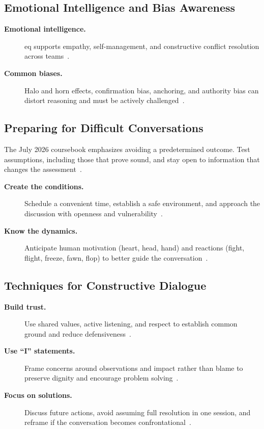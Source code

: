 \documentclass[../main.tex]{subfiles}
\begin{document}
\subsection{Emotional Intelligence and Bias Awareness}
\begin{description}
  \item[\textbf{Emotional intelligence.}] \ac{eq} supports empathy, self-management, and constructive
  conflict resolution across teams~\autocite{edo-5-2-9-critical-conversations-2025}.
  \item[\textbf{Common biases.}] Halo and horn effects, confirmation bias, anchoring, and authority bias can
  distort reasoning and must be actively challenged~\autocite{edo-5-2-9-critical-conversations-2025}.
\end{description}

\subsection{Preparing for Difficult Conversations}
\noindent The July 2026 coursebook emphasizes avoiding a predetermined outcome. Test assumptions, including those that prove sound, and stay open to information that changes the assessment~\autocite{edo-5-2-9-critical-conversations-2025}.

\begin{description}
  \item[\textbf{Create the conditions.}] Schedule a convenient time, establish a safe environment, and
  approach the discussion with openness and vulnerability~\autocite{edo-5-2-9-critical-conversations-2025}.
  \item[\textbf{Know the dynamics.}] Anticipate human motivation (heart, head, hand) and reactions (fight,
  flight, freeze, fawn, flop) to better guide the conversation~\autocite{edo-5-2-9-critical-conversations-2025}.
\end{description}

\subsection{Techniques for Constructive Dialogue}
\begin{description}
  \item[\textbf{Build trust.}] Use shared values, active listening, and respect to establish common ground
  and reduce defensiveness~\autocite{edo-5-2-9-critical-conversations-2025}.
  \item[\textbf{Use ``I'' statements.}] Frame concerns around observations and impact rather than blame to
  preserve dignity and encourage problem solving~\autocite{edo-5-2-9-critical-conversations-2025}.
  \item[\textbf{Focus on solutions.}] Discuss future actions, avoid assuming full resolution in one session,
  and reframe if the conversation becomes confrontational~\autocite{edo-5-2-9-critical-conversations-2025}.
\end{description}
\end{document}
